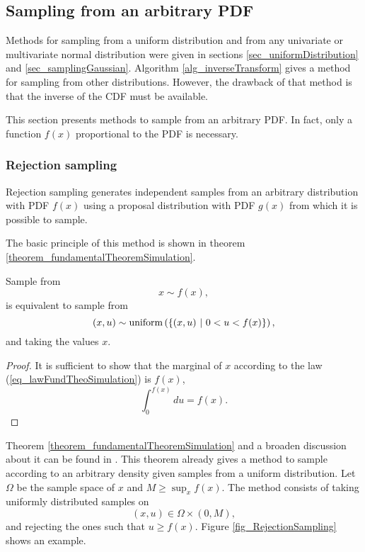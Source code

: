 \subsection{Sampling from an arbitrary PDF} \label{sec_samplingArbitraryPDF}

Methods for sampling from a uniform distribution and from any univariate or multivariate normal distribution were given in sections \ref{sec_uniformDistribution} and \ref{sec_samplingGaussian}. 
Algorithm \ref{alg_inverseTransform} gives a method for sampling from other distributions. However, the drawback of that method is that the inverse of the CDF must be available. 

This section presents methods to sample from an arbitrary PDF. In fact, only a function $f(x)$ proportional to the PDF is necessary.

\subsubsection{Rejection sampling}
Rejection sampling generates independent samples from an arbitrary distribution with PDF $f(x)$ using a proposal distribution with PDF $g(x)$ from which it is possible to sample. 

The basic principle of this method is shown in theorem \ref{theorem_fundamentalTheoremSimulation}.

\begin{theorem} \label{theorem_fundamentalTheoremSimulation}
  Sample from 
  $$
    x \sim f(x),
  $$ 
  is equivalent to sample from
  \begin{equation} \label{eq_lawFundTheoSimulation}
    (x,u) \sim \textup{uniform}\left( \left\{ (x,u) \ | \ 0 < u < f(x) \right\} \right),
  \end{equation}
  and taking the values $x$.
  \begin{proof}
    It is sufficient to show that the marginal of $x$ according to the law (\ref{eq_lawFundTheoSimulation}) is $f(x)$,
    $$
      \int_0^{f(x)}du = f(x). 
    $$
  \end{proof}
\end{theorem}

Theorem \ref{theorem_fundamentalTheoremSimulation} and a broaden discussion about it can be found in \textcite{robert2004}. This theorem already gives a method to sample according to an arbitrary density given samples from a uniform distribution. Let $\Omega$ be the sample space of $x$ and $M \geq \sup_x f(x)$. The method consists of taking uniformly distributed samples on
$$
  (x,u) \in \Omega\times(0,M),
$$ 
and rejecting the ones such that $u \geq f(x)$. Figure \ref{fig_RejectionSampling} shows an example. 

